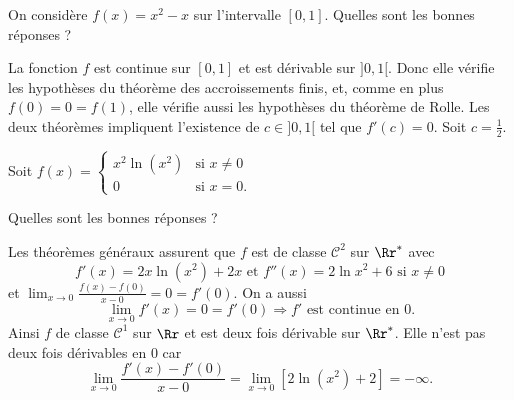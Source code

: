 \begin{question}

On considère $\displaystyle f(x)=x^2-x$ sur l'intervalle $[0,1]$. Quelles sont les bonnes réponses ?
\begin{answers}  
\end{answers}
\begin{explanations}
La fonction $f$ est continue sur $[0,1]$ et est dérivable sur $]0,1[$. Donc elle vérifie les hypothèses du théorème des accroissements finis, et, comme en plus $f(0)=0=f(1)$, elle vérifie aussi les hypothèses du théorème de Rolle. Les deux théorèmes impliquent l'existence de $c\in ]0,1[$ tel que $f'(c)=0$. Soit $\displaystyle c=\frac{1}{2}$.
\end{explanations}
\end{question}



\begin{question}

Soit $f(x)=\left\{\begin{array}{ll}x^2\ln (x^2)&\mbox{si }x\neq 0\\ 0&\mbox{si }x=0.\end{array} \right.$

Quelles sont les bonnes réponses ?
\begin{answers}  
\end{answers}
\begin{explanations}
Les théorèmes généraux assurent que $f$ est de classe $\mathcal{C}^2$ sur $\Rr^*$ avec
$$f'(x)=2x\ln (x^2)+2x\mbox{ et }f''(x)=2\ln x^2+6\mbox{ si }x\neq 0$$
et $\displaystyle \lim _{x\to 0}\frac{f(x)-f(0)}{x-0}=0=f'(0)$. On a aussi
$$\lim _{x\to 0}f'(x)=0=f'(0) \Rightarrow f'\mbox{ est continue en }0.$$
Ainsi $f$ de classe $\mathcal{C}^1$ sur $\Rr$ et est deux fois dérivable sur $\Rr^*$. Elle n'est pas deux fois dérivables en $0$ car
$$\lim _{x\to 0}\frac{f'(x)-f'(0)}{x-0}=\lim _{x\to 0}[2\ln (x^2)+2]=-\infty.$$
\end{explanations}
\end{question}



